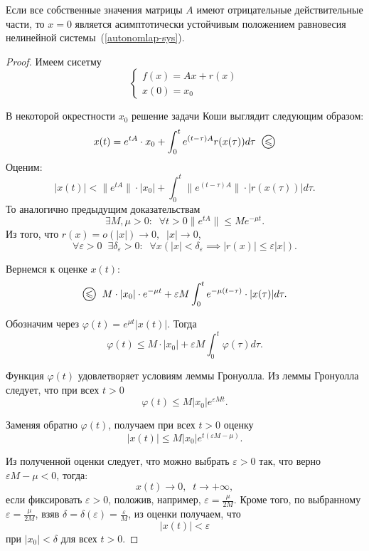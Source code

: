 \begin{theorem}[Ляпунова (б/д)]
Если все собственные значения матрицы $A$ имеют отрицательные действительные части, то $x = 0$ является асимптотически устойчивым положением равновесия нелинейной системы~(\ref{autonomlap-sys}).
\end{theorem}
\begin{proof}
Имеем сисетму
\begin{equation*}
    \begin{cases}
    f(x) = Ax + r(x)\\
    x(0) = x_0
    \end{cases}
\end{equation*}

В некоторой окрестности $x_0$ решение задачи Коши выглядит следующим образом:
\[x(t) = e^{tA} \cdot x_0 + \int_0^t e^{(t - \tau)A} r(x(\tau)) d\tau \;\; \cleq \]
Оценим:
\[|x(t)| < \|e^{tA}\|\cdot |x_0| + \int_0^t \|e^{(t - \tau)A}\| \cdot |r(x(\tau))| d\tau. \]
То аналогично предыдущим доказательствам 
\[\exists M, \mu > 0: \;\; \forall t > 0 \|e^{tA}\| \leq M e^{-\mu t}.\]
Из того, что $r(x) = o(|x|) \rightarrow 0,\;\; |x| \rightarrow 0$, 
\[\forall \varepsilon > 0\;\; \exists \delta_{\varepsilon} > 0:\;\; \forall x (|x| < \delta_{\varepsilon} \implies |r(x)| \le \varepsilon |x|).\]

Вернемся к оценке $x(t):$
\[\cleq \;\; M \cdot |x_0| \cdot e^{-\mu t} + \varepsilon M \int_0^t e^{-\mu(t - \tau)} \cdot |x(\tau)| d\tau.\]

Обозначим через \(\varphi(t) = e^{\mu t}|x(t)|\). Тогда
\[\varphi(t) \leq M \cdot |x_0| + \varepsilon M \int_0^t \varphi(\tau) d\tau.\]

Функция $\varphi(t)$ удовлетворяет условиям леммы Гронуолла. Из леммы Гронуолла следует, что при всех $t > 0$
\[\varphi(t) \leq M|x_0| e^{\varepsilon M t}.\]

Заменяя обратно $\varphi(t)$, получаем при всех $t > 0$ оценку
\[|x(t)| \leq M |x_0| e^{t(\varepsilon M - \mu )}.\]

Из полученной оценки следует, что можно выбрать $\varepsilon > 0$ так, что верно $\varepsilon M - \mu < 0$, тогда:
\[x(t) \rightarrow 0, \;\; t \rightarrow +\infty,\]
если фиксировать $\varepsilon > 0$, положив, например, \(\varepsilon = \frac{\mu}{2M}\). Кроме того, по выбранному $\varepsilon =  \frac{\mu}{2M}$, взяв $\delta = \delta(\varepsilon) = \frac{\varepsilon}{M}$, из оценки получаем, что 
\[|x(t)| < \varepsilon\]
при $|x_0| < \delta$ для всех $t > 0$.
\end{proof}

